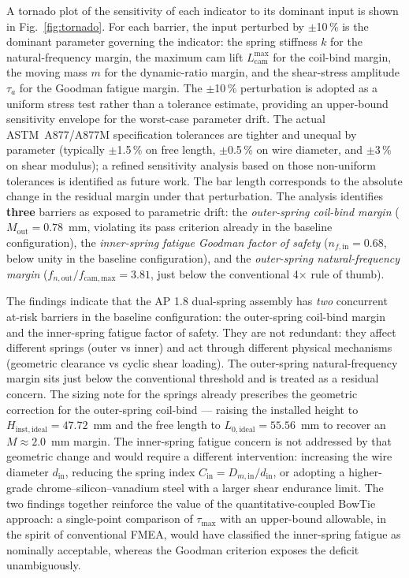 A tornado plot of the sensitivity of each indicator to its dominant
input is shown in Fig.~\ref{fig:tornado}. For each barrier, the input
perturbed by $\pm$10\,\% is the dominant parameter governing the
indicator: the spring stiffness $k$ for the natural-frequency margin,
the maximum cam lift $L_{\mathrm{cam}}^{\max}$ for the coil-bind
margin, the moving mass $m$ for the dynamic-ratio margin, and the
shear-stress amplitude $\tau_{a}$ for the Goodman fatigue margin. The
$\pm$10\,\% perturbation is adopted as a uniform stress test rather
than a tolerance estimate, providing an upper-bound sensitivity
envelope for the worst-case parameter drift. The actual ASTM~A877/A877M
specification tolerances are tighter and unequal by parameter
(typically $\pm$1.5\,\% on free length, $\pm$0.5\,\% on wire diameter,
and $\pm$3\,\% on shear modulus); a refined sensitivity analysis based
on those non-uniform tolerances is identified as future work. The bar length
corresponds to the absolute change in the residual margin under that
perturbation. The analysis identifies \textbf{three} barriers as
exposed to parametric drift: the \emph{outer-spring coil-bind margin}
($M_{\mathrm{out}}=0.78$~mm, violating its pass criterion already in
the baseline configuration), the \emph{inner-spring fatigue Goodman
factor of safety}
($n_{f,\mathrm{in}}=0.68$, below unity in the baseline configuration),
and the \emph{outer-spring natural-frequency margin}
($f_{n,\mathrm{out}}/f_{\mathrm{cam,max}}=3.81$, just below the
conventional 4$\times$ rule of thumb).

The findings indicate that the AP 1.8 dual-spring assembly has
\emph{two} concurrent at-risk barriers in the baseline configuration:
the outer-spring coil-bind margin and the inner-spring fatigue
factor of safety. They are not redundant: they affect different
springs (outer vs inner) and act through different physical
mechanisms (geometric clearance vs cyclic shear loading). The
outer-spring natural-frequency margin sits just below the
conventional threshold and is treated as a residual concern. The
sizing note for the springs already prescribes the geometric
correction for the outer-spring coil-bind --- raising the installed
height to $H_{\mathrm{inst,ideal}}=47.72$~mm and the free length to
$L_{0,\mathrm{ideal}}=55.56$~mm to recover an $M\approx 2.0$~mm
margin. The inner-spring fatigue concern is not addressed by that
geometric change and would require a different intervention:
increasing the wire diameter $d_{\mathrm{in}}$, reducing the spring
index $C_{\mathrm{in}}=D_{m,\mathrm{in}}/d_{\mathrm{in}}$, or
adopting a higher-grade chrome--silicon--vanadium steel with a
larger shear endurance limit. The two findings together reinforce
the value of the quantitative-coupled BowTie approach: a single-point
comparison of $\tau_{\max}$ with an upper-bound allowable, in the
spirit of conventional FMEA, would have classified the inner-spring
fatigue as nominally acceptable, whereas the Goodman criterion
exposes the deficit unambiguously.

